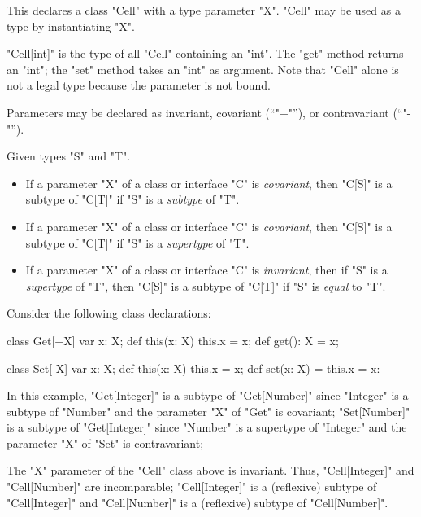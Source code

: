 This declares a class \xcd"Cell" with a type parameter \xcd"X".
\xcd"Cell" may be used as a type by instantiating \xcd"X".

\xcd"Cell[int]" is the type of all \xcd"Cell" containing an
\xcd"int".  The \xcd"get" method returns an \xcd"int"; the
\xcd"set" method takes an \xcd"int" as argument.  Note that
\xcd"Cell" alone is not a legal type because the parameter is
not bound.

Parameters may be declared as invariant, covariant (``\xcd"+"''),
or contravariant (``\xcd"-"'').

Given types \xcd"S" and \xcd"T".
\begin{itemize}
\item
If a parameter \xcd"X" of a class or interface \xcd"C" is
\emph{covariant}, then 
\xcd"C[S]" is a subtype of \xcd"C[T]" if
\xcd"S" is a {\em subtype} of \xcd"T".

\item
If a parameter \xcd"X" of a class or interface \xcd"C" is
\emph{covariant}, then 
\xcd"C[S]" is a subtype of \xcd"C[T]" if
\xcd"S" is a {\em supertype} of \xcd"T".

\item
If a parameter \xcd"X" of a class or interface \xcd"C" is
\emph{invariant}, then 
if \xcd"S" is a {\em supertype} of \xcd"T", then
\xcd"C[S]" is a subtype of \xcd"C[T]" if
\xcd"S" is {\em equal} to \xcd"T".
\end{itemize}

Consider the following class declarations:
\begin{xten}
class Get[+X] {
    var x: X;
    def this(x: X) { this.x = x; }
    def get(): X = x;
}

class Set[-X] {
    var x: X;
    def this(x: X) { this.x = x; }
    def set(x: X) = { this.x = x: }
}
\end{xten}
In this example, \xcd"Get[Integer]" is a subtype of
\xcd"Get[Number]" since \xcd"Integer" is a subtype of
\xcd"Number" and the parameter \xcd"X" of \xcd"Get" is covariant;
\xcd"Set[Number]" is a subtype of
\xcd"Get[Integer]" since \xcd"Number" is a supertype of
\xcd"Integer"
 and the parameter \xcd"X" of \xcd"Set" is contravariant;

The \xcd"X" parameter of the \xcd"Cell" class above is invariant.
Thus, \xcd"Cell[Integer]" and \xcd"Cell[Number]" are
incomparable;
      \xcd"Cell[Integer]" is a (reflexive) subtype of \xcd"Cell[Integer]"
      and
      \xcd"Cell[Number]" is a (reflexive) subtype of
      \xcd"Cell[Number]".

